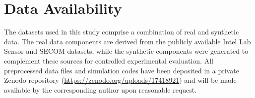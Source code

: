 \documentclass[11pt]{article}
\theoremstyle{plain}
\theoremstyle{definition}
\theoremstyle{remark}
\begin{document}
\section*{Data Availability}

The datasets used in this study comprise a combination of real and synthetic data. 
The real data components are derived from the publicly available Intel Lab Sensor and SECOM datasets, 
while the synthetic components were generated to complement these sources for controlled experimental evaluation. 
All preprocessed data files and simulation codes have been deposited in a private Zenodo repository 
(\href{https://zenodo.org/uploads/17418921}{https://zenodo.org/uploads/17418921}) 
and will be made available by the corresponding author upon reasonable request.






\end{document}
